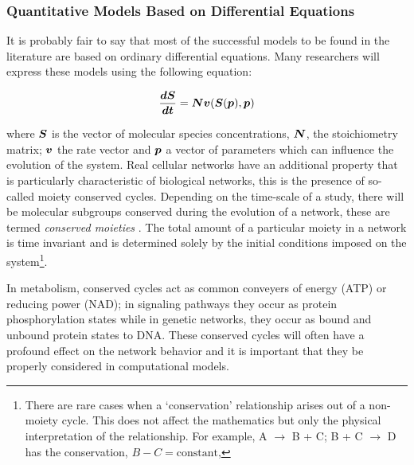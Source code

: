 \documentclass[12pt]{article}
\newcommand{\bN}{\mbox{\boldmath $N$}}
\newcommand{\bS}{\mbox{\boldmath $S$}}
\newcommand{\bdS}{\mbox{\boldmath $dS$}}
\newcommand{\bdt}{\mbox{\boldmath $dt$}}
\newcommand{\bv}{\mbox{\boldmath $v$}}
\newcommand{\bp}{\mbox{\boldmath $p$}}
\begin{document}
\subsubsection{Quantitative Models Based on Differential Equations}

It is probably fair to say that most of the successful models to
be found in the literature are based on ordinary differential
equations. Many researchers will express these models using the
following equation:

\begin{equation}
\frac{\bdS}{\bdt} = \bN \bv (\bS (\bp), \bp) \label{eq:system}
\end{equation}

where $\bS$ is the vector of molecular species concentrations,
$\bN$, the stoichiometry matrix; $\bv$ the rate vector and $\bp$ a
vector of parameters which can influence the evolution of the
system. Real cellular networks have an additional property that is
particularly characteristic of biological networks, this is the
presence of so-called moiety conserved cycles. Depending on the
time-scale of a study, there will be molecular subgroups conserved
during the evolution of a network, these are termed {\em conserved
moieties} \cite{Re81}. The total amount of a particular moiety in
a network is time invariant and is determined solely by the
initial conditions imposed on the system\footnote {There are rare
cases when a `conservation' relationship arises out of a
non-moiety cycle. This does not affect the mathematics but only
the physical interpretation of the relationship. For example, A
$\rightarrow$ B + C; B + C $\rightarrow$ D has the conservation,
$B - C =\mbox{constant}$, }.

In metabolism, conserved cycles act as common conveyers of energy (ATP) or reducing power (NAD); in signaling pathways they occur as protein phosphorylation states while in genetic networks, they occur as bound and unbound protein states to DNA. These conserved cycles will often have a profound effect on the network behavior and it is important that they be properly considered in computational models.
\end{document}
